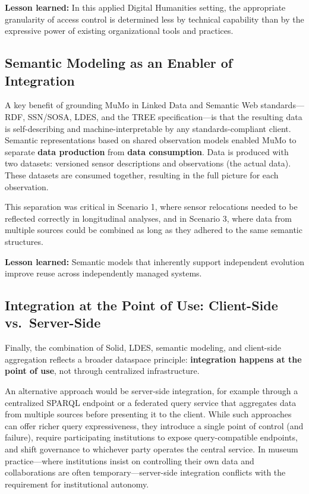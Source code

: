 \documentclass{ceurart}
\begin{document}
\textbf{Lesson learned:} In this applied Digital Humanities setting, the
appropriate granularity of access control is determined less by
technical capability than by the expressive power of existing
organizational tools and practices.

\subsection{Semantic Modeling as an Enabler of
Integration}\label{semantic-modeling-as-an-enabler-of-integration}

A key benefit of grounding MuMo in Linked Data and Semantic Web
standards---RDF, SSN/SOSA, LDES, and the TREE specification---is that
the resulting data is self-describing and machine-interpretable by any
standards-compliant client. Semantic representations based on shared
observation models enabled MuMo to separate \textbf{data production}
from \textbf{data consumption}. Data is produced with two datasets:
versioned sensor descriptions and observations (the actual data). These
datasets are consumed together, resulting in the full picture for each
observation.

This separation was critical in Scenario 1, where sensor relocations
needed to be reflected correctly in longitudinal analyses, and in
Scenario 3, where data from multiple sources could be combined as long
as they adhered to the same semantic structures.

\textbf{Lesson learned:} Semantic models that inherently support
independent evolution improve reuse across independently managed
systems.

\subsection{Integration at the Point of Use: Client-Side
vs.~Server-Side}\label{integration-at-the-point-of-use-client-side-vs.-server-side}

Finally, the combination of Solid, LDES, semantic modeling, and
client-side aggregation reflects a broader dataspace principle:
\textbf{integration happens at the point of use}, not through
centralized infrastructure.

An alternative approach would be server-side integration, for example
through a centralized SPARQL endpoint or a federated query service that
aggregates data from multiple sources before presenting it to the
client. While such approaches can offer richer query expressiveness,
they introduce a single point of control (and failure), require
participating institutions to expose query-compatible endpoints, and
shift governance to whichever party operates the central service. In
museum practice---where institutions insist on controlling their own
data and collaborations are often temporary---server-side integration
conflicts with the requirement for institutional autonomy.
\end{document}
